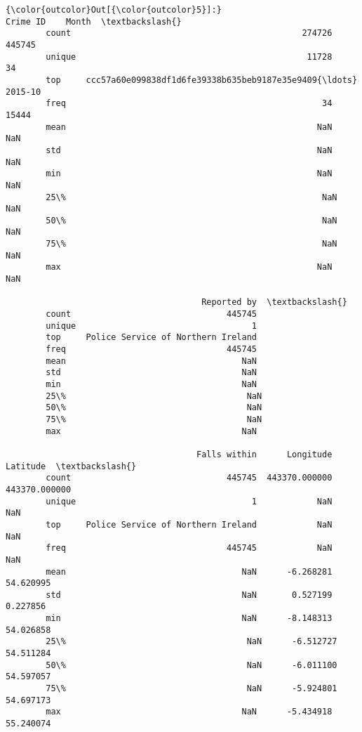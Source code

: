 \documentclass[11pt]{article}
\begin{document}
\begin{Verbatim}[commandchars=\\\{\}]
{\color{outcolor}Out[{\color{outcolor}5}]:}                                                  Crime ID    Month  \textbackslash{}
        count                                              274726   445745   
        unique                                              11728       34   
        top     ccc57a60e099838df1d6fe39338b635beb9187e35e9409{\ldots}  2015-10   
        freq                                                   34    15444   
        mean                                                  NaN      NaN   
        std                                                   NaN      NaN   
        min                                                   NaN      NaN   
        25\%                                                   NaN      NaN   
        50\%                                                   NaN      NaN   
        75\%                                                   NaN      NaN   
        max                                                   NaN      NaN   
        
                                       Reported by  \textbackslash{}
        count                               445745   
        unique                                   1   
        top     Police Service of Northern Ireland   
        freq                                445745   
        mean                                   NaN   
        std                                    NaN   
        min                                    NaN   
        25\%                                    NaN   
        50\%                                    NaN   
        75\%                                    NaN   
        max                                    NaN   
        
                                      Falls within      Longitude       Latitude  \textbackslash{}
        count                               445745  443370.000000  443370.000000   
        unique                                   1            NaN            NaN   
        top     Police Service of Northern Ireland            NaN            NaN   
        freq                                445745            NaN            NaN   
        mean                                   NaN      -6.268281      54.620995   
        std                                    NaN       0.527199       0.227856   
        min                                    NaN      -8.148313      54.026858   
        25\%                                    NaN      -6.512727      54.511284   
        50\%                                    NaN      -6.011100      54.597057   
        75\%                                    NaN      -5.924801      54.697173   
        max                                    NaN      -5.434918      55.240074   
        

\end{Verbatim}
\end{document}
